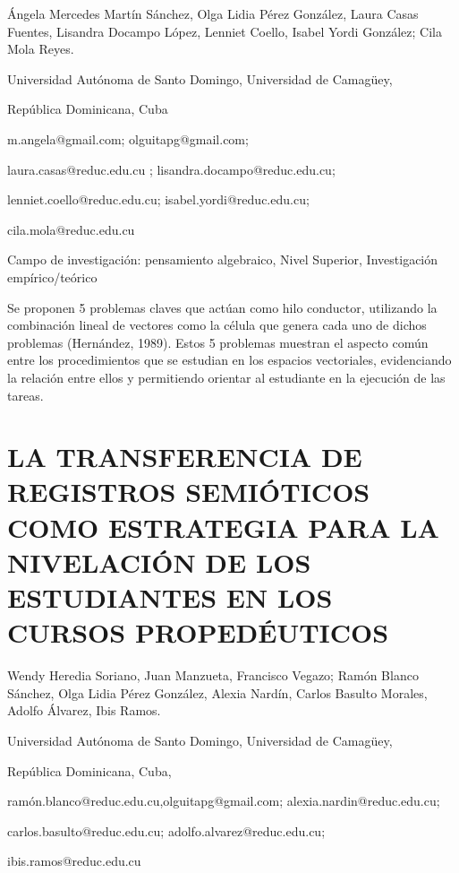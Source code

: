 \begin{datos}

Ángela Mercedes Martín Sánchez, Olga Lidia Pérez González, Laura Casas
Fuentes, Lisandra Docampo López, Lenniet Coello, Isabel Yordi González;
Cila Mola Reyes.

Universidad Autónoma de Santo Domingo, Universidad de Camagüey,

República Dominicana, Cuba

m.angela@gmail.com; olguitapg@gmail.com;

laura.casas@reduc.edu.cu ; lisandra.docampo@reduc.edu.cu;

lenniet.coello@reduc.edu.cu; isabel.yordi@reduc.edu.cu; 

cila.mola@reduc.edu.cu

\end{datos}

Campo de investigación: pensamiento algebraico, Nivel Superior, Investigación
empírico/teórico

Se proponen 5 problemas claves que actúan como hilo conductor, utilizando
la combinación lineal de vectores como la célula que genera cada uno
de dichos problemas (Hernández, 1989). Estos 5 problemas muestran
el aspecto común entre los procedimientos que se estudian en los espacios
vectoriales, evidenciando la relación entre ellos y permitiendo orientar
al estudiante en la ejecución de las tareas. 


\section{LA TRANSFERENCIA DE REGISTROS SEMIÓTICOS COMO ESTRATEGIA PARA LA
NIVELACIÓN DE LOS ESTUDIANTES EN LOS CURSOS PROPEDÉUTICOS}

\begin{datos}

Wendy Heredia Soriano, Juan Manzueta, Francisco Vegazo; Ramón Blanco
Sánchez, Olga Lidia Pérez González, Alexia Nardín, Carlos Basulto
Morales, Adolfo Álvarez, Ibis Ramos.

Universidad Autónoma de Santo Domingo, Universidad de Camagüey,

República Dominicana, Cuba,

ramón.blanco@reduc.edu.cu,olguitapg@gmail.com; alexia.nardin@reduc.edu.cu;

carlos.basulto@reduc.edu.cu; adolfo.alvarez@reduc.edu.cu; 

ibis.ramos@reduc.edu.cu

\end{datos}

